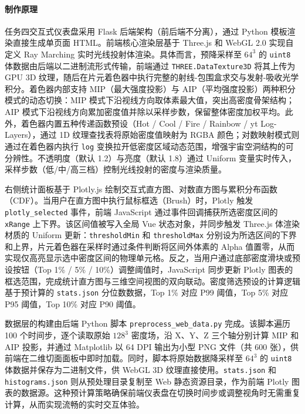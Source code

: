 \documentclass[12pt,a4paper]{article}
\begin{document}
\paragraph{制作原理}任务四交互式仪表盘采用 Flask 后端架构（前后端不分离），通过 Python 模板渲染直接生成单页面 HTML。前端核心渲染层基于 Three.js 和 WebGL 2.0 实现自定义 Ray Marching 实时光线投射体渲染。具体而言，预降采样至 $64^3$ 的 \texttt{uint8} 体数据由后端以二进制流形式传输，前端通过 \texttt{THREE.DataTexture3D} 将其上传为 GPU 3D 纹理，随后在片元着色器中执行完整的射线-包围盒求交与发射-吸收光学积分。着色器内部支持 MIP（最大强度投影）与 AIP（平均强度投影）两种积分模式的动态切换：MIP 模式下沿视线方向取体素最大值，突出高密度骨架结构；AIP 模式下沿视线方向累加密度值并除以采样步数，保留整体密度加权平均。此外，着色器内置五种传递函数预设（Hot / Cool / Fire / Rainbow / yt Log-Layers），通过 1D 纹理查找表将原始密度值映射为 RGBA 颜色；对数映射模式则通过在着色器内执行 \texttt{log} 变换拉开低密度区域动态范围，增强宇宙空洞结构的可分辨性。不透明度（默认 1.2）与亮度（默认 1.8）通过 Uniform 变量实时传入，采样步数（低/中/高三档）控制光线投射的密度与渲染质量。

右侧统计面板基于 Plotly.js 绘制交互式直方图、对数直方图与累积分布函数（CDF）。当用户在直方图中执行鼠标框选（Brush）时，Plotly 触发 \texttt{plotly\_selected} 事件，前端 JavaScript 通过事件回调捕获所选密度区间的 \texttt{xRange} 上下界。该区间值被写入全局 Vue 状态对象，并同步触发 Three.js 体渲染材质的 Uniform 更新：\texttt{thresholdMin} 和 \texttt{thresholdMax} 分别设为所选区间的下界和上界，片元着色器在采样时通过条件判断将区间外体素的 Alpha 值置零，从而实现仅高亮显示选中密度区间的物理单元格。反之，当用户通过底部密度滑块或预设按钮（Top 1\% / 5\% / 10\%）调整阈值时，JavaScript 同步更新 Plotly 图表的框选范围，完成统计直方图与三维空间视图的双向联动。密度筛选预设的计算逻辑基于预计算的 \texttt{stats.json} 分位数数据，Top 1\% 对应 P99 阈值，Top 5\% 对应 P95 阈值，Top 10\% 对应 P90 阈值。

数据层的构建由后端 Python 脚本 \texttt{preprocess\_web\_data.py} 完成。该脚本遍历 100 个时间步，逐个读取原始 $128^3$ 密度场，沿 X、Y、Z 三个轴分别计算 MIP 和 AIP 投影，并通过 Matplotlib 以 64 DPI 输出为小型 PNG 文件（共 600 张），供前端在二维切面面板中即时加载。同时，脚本将原始数据降采样至 $64^3$ 的 \texttt{uint8} 体数据并保存为二进制文件，供 WebGL 3D 纹理直接使用。\texttt{stats.json} 和 \texttt{histograms.json} 则从预处理目录复制至 Web 静态资源目录，作为前端 Plotly 图表的数据源。这种预计算策略确保前端仪表盘在切换时间步或调整视角时无需重复计算，从而实现流畅的实时交互体验。
\end{document}
